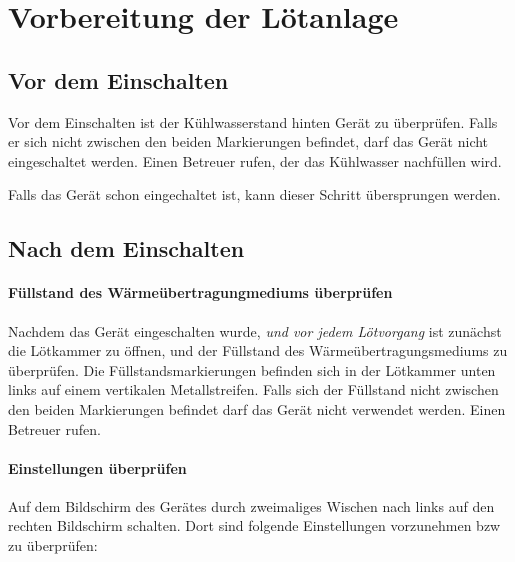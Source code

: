 \documentclass{\basedir/fablab-document}
\renewcommand{\todo}[1]{\textbf{\color{red}{TODO: #1}}}
\begin{document}
\section{Vorbereitung der L{\"o}tanlage}
\subsection{Vor dem Einschalten}

Vor dem Einschalten ist der K{\"u}hlwasserstand hinten Ger{\"a}t zu {\"u}berpr{\"u}fen. Falls er sich nicht zwischen den beiden Markierungen befindet, darf das Ger{\"a}t nicht eingeschaltet werden. Einen Betreuer rufen, der das K{\"u}hlwasser nachf{\"u}llen wird.


Falls das Ger{\"a}t schon eingechaltet ist, kann dieser Schritt {\"u}bersprungen werden.

\subsection{Nach dem Einschalten}

\paragraph{F{\"u}llstand des W{\"a}rme{\"u}bertragungmediums {\"u}berpr{\"u}fen}

Nachdem das Ger{\"a}t eingeschalten wurde, \textit{und vor jedem L{\"o}tvorgang} ist zun{\"a}chst die L{\"o}tkammer zu {\"o}ffnen, und der F{\"u}llstand des W{\"a}rme{\"u}bertragungsmediums zu {\"u}berpr{\"u}fen. Die F{\"u}llstandsmarkierungen befinden sich in der L{\"o}tkammer unten links auf einem vertikalen Metallstreifen. Falls sich der F{\"u}llstand nicht zwischen den beiden Markierungen befindet darf das Ger{\"a}t nicht verwendet werden. Einen Betreuer rufen.


\paragraph{Einstellungen {\"u}berpr{\"u}fen}

Auf dem Bildschirm des Ger{\"a}tes durch zweimaliges Wischen nach links auf den rechten Bildschirm schalten. Dort sind folgende Einstellungen vorzunehmen bzw zu {\"u}berpr{\"u}fen:\\
\end{document}
